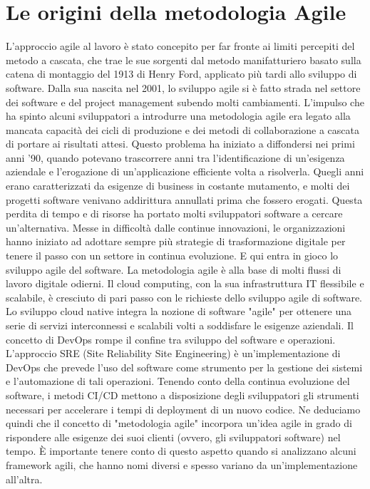 \documentclass[a4paper,12pt,titlepage,oneside]{book}
\begin{document}
\section{Le origini della metodologia Agile}
    L'approccio agile al lavoro è stato concepito per far fronte ai limiti percepiti del metodo a cascata, che trae le sue sorgenti dal metodo manifatturiero basato sulla catena di montaggio del 1913 di Henry Ford, applicato più tardi allo sviluppo di software. Dalla sua nascita nel 2001, 
    lo sviluppo agile si è fatto strada nel settore dei software e del project management subendo molti cambiamenti.
    L'impulso che ha spinto alcuni sviluppatori a introdurre una metodologia agile era legato alla mancata capacità dei cicli di produzione e dei metodi di collaborazione a cascata di portare ai risultati attesi. Questo problema ha iniziato a diffondersi nei primi anni '90, 
    quando potevano trascorrere anni tra l'identificazione di un'esigenza aziendale e l'erogazione di un'applicazione efficiente volta a risolverla. Quegli anni erano caratterizzati da esigenze di business in costante mutamento, e molti dei progetti software venivano addirittura 
    annullati prima che fossero erogati. Questa perdita di tempo e di risorse ha portato molti sviluppatori software a cercare un'alternativa.
    Messe in difficoltà dalle continue innovazioni, le organizzazioni hanno iniziato ad adottare sempre più strategie di trasformazione digitale per tenere il passo con un settore in continua evoluzione. E qui entra in gioco lo sviluppo agile del software.
    La metodologia agile è alla base di molti flussi di lavoro digitale odierni. Il cloud computing, con la sua infrastruttura IT flessibile e scalabile, è cresciuto di pari passo con le richieste dello sviluppo agile di software. Lo sviluppo cloud native integra 
    la nozione di software "agile" per ottenere una serie di servizi interconnessi e scalabili volti a soddisfare le esigenze aziendali.
    Il concetto di DevOps rompe il confine tra sviluppo del software e operazioni. L'approccio SRE (Site Reliability Site Engineering) è un'implementazione di DevOps che prevede l'uso del software come strumento per la gestione dei sistemi e l'automazione di tali operazioni.
    Tenendo conto della continua evoluzione del software, i metodi CI/CD mettono a disposizione degli sviluppatori gli strumenti necessari per accelerare i tempi di deployment di un nuovo codice.
    Ne deduciamo quindi che il concetto di "metodologia agile" incorpora un'idea agile in grado di rispondere alle esigenze dei suoi clienti (ovvero, gli sviluppatori software) nel tempo. È importante tenere conto di questo aspetto quando si analizzano alcuni framework agili, 
    che hanno nomi diversi e spesso variano da un'implementazione all'altra.
\end{document}
